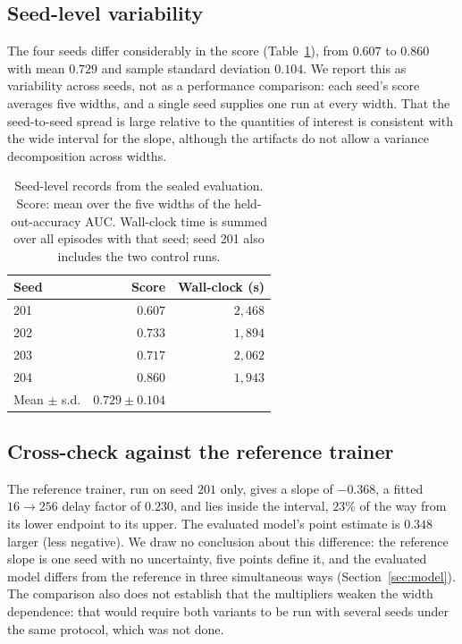 \documentclass{article}
\begin{document}
\subsection{Seed-level variability}
The four seeds differ considerably in the score (Table~\ref{tab:seeds}), from $0.607$ to $0.860$ with mean $0.729$ and sample standard deviation $0.104$. We report this as variability across seeds, not as a performance comparison: each seed's score averages five widths, and a single seed supplies one run at every width. That the seed-to-seed spread is large relative to the quantities of interest is consistent with the wide interval for the slope, although the artifacts do not allow a variance decomposition across widths.

\begin{table}[t]
\centering
\caption{Seed-level records from the sealed evaluation. Score: mean over the five widths of the held-out-accuracy AUC. Wall-clock time is summed over all episodes with that seed; seed 201 also includes the two control runs.}
\label{tab:seeds}
\small
\begin{tabular}{lrr}
\toprule
Seed & Score & Wall-clock (s) \\
\midrule
201 & $0.607$ & $2{,}468$ \\
202 & $0.733$ & $1{,}894$ \\
203 & $0.717$ & $2{,}062$ \\
204 & $0.860$ & $1{,}943$ \\
\midrule
Mean $\pm$ s.d. & $0.729 \pm 0.104$ & \\
\bottomrule
\end{tabular}
\end{table}

\subsection{Cross-check against the reference trainer}
The reference trainer, run on seed $201$ only, gives a slope of $-0.368$, a fitted $16\to256$ delay factor of $0.230$, and lies inside the interval, $23\%$ of the way from its lower endpoint to its upper. The evaluated model's point estimate is $0.348$ larger (less negative). We draw no conclusion about this difference: the reference slope is one seed with no uncertainty, five points define it, and the evaluated model differs from the reference in three simultaneous ways (Section~\ref{sec:model}). The comparison also does not establish that the multipliers weaken the width dependence: that would require both variants to be run with several seeds under the same protocol, which was not done.
\end{document}
